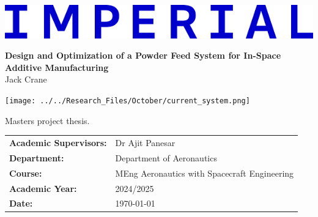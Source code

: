 \documentclass[11pt,a4paper]{report}
\begin{document}
\begin{titlepage}

    \noindent
    \begin{minipage}{0.5\textwidth}
        \includegraphics[width=\linewidth]{../report_assets/imperial.png}
    \end{minipage}
    \hfill
    
    \vspace{1cm} %
    \begin{center}
        {\huge \textbf{Design and Optimization of a Powder Feed System for In-Space Additive Manufacturing}}\\[1cm]
        {\Large Jack Crane}\\[1cm]

        \begin{minipage}{0.8\textwidth}
            \texttt{[image: ../../Research\_Files/October/current\_system.png]}
        \end{minipage}
        \hfill
        
        \vspace{1cm} %

        Masters project thesis.\\

        \begin{center}
            \renewcommand{\arraystretch}{1.5}
            \hfill\begin{tabular}{p{} p{}}
            \hfill\textbf{Academic Supervisors:} & Dr Ajit Panesar \\ 
            \hfill\textbf{Department:}           & Department of Aeronautics \\
            \hfill\textbf{Course:}               & MEng Aeronautics with Spacecraft Engineering \\
            \hfill\textbf{Academic Year:}        & 2024/2025 \\
            \hfill\textbf{Date:}                 & \today \\
            \end{tabular}
        \end{center}
            
        
    \end{center}
\end{titlepage}
\end{document}

